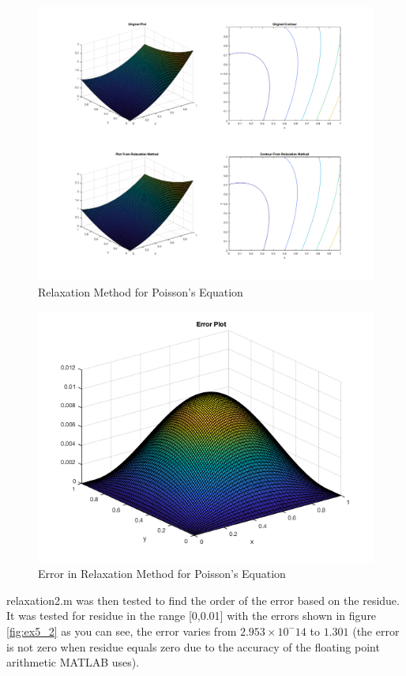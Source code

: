 \documentclass[11pt, oneside, titlepage]{article}   	%
\begin{document}
\begin{figure}[H]
	\includegraphics[width = \textwidth]{exercise5_1}
	\caption{Relaxation Method for Poisson's Equation} \label{fig:ex5_1}
\end{figure}

\begin{figure}[H]
	\includegraphics[width = \textwidth]{exercise5_1a}
	\caption{Error in Relaxation Method for Poisson's Equation} \label{fig:ex5_1a}
\end{figure}

relaxation2.m was then tested to find the order of the error based on the residue. It was tested for residue in the range [0,0.01] with the errors shown in figure \ref{fig:ex5_2}  as you can see, the error varies from $2.953\times10^-14$ to $1.301$ (the error is not zero when residue equals zero due to the accuracy of the floating point arithmetic MATLAB uses).
\end{document}

